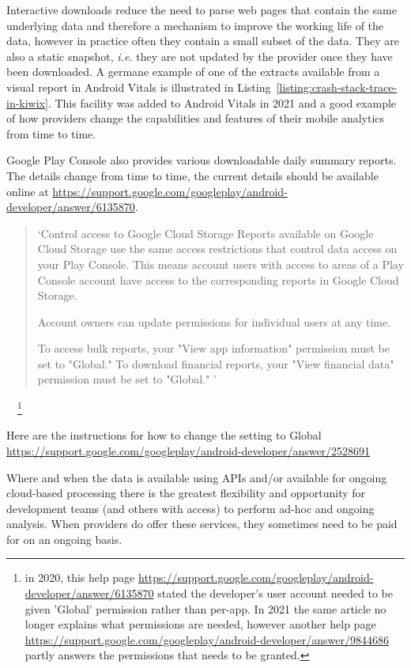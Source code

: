 Interactive downloads reduce the need to parse web pages that contain the same underlying data and therefore a mechanism to improve the working life of the data, however in practice often they contain a small subset of the data. They are also a static snapshot, \textit{i.e.} they are not updated by the provider once they have been downloaded. A germane example of one of the extracts available from a visual report in Android Vitals is illustrated in Listing~\ref{listing:crash-stack-trace-in-kiwix}. This facility was added to Android Vitals in 2021 and a good example of how providers change the capabilities and features of their mobile analytics from time to time.

Google Play Console also provides various downloadable daily summary reports. The details change from time to time, the current details should be available online at \url{https://support.google.com/googleplay/android-developer/answer/6135870}.

{\footnotesize
\begin{quote}
    `Control access to Google Cloud Storage
    Reports available on Google Cloud Storage use the same access restrictions that control data access on your Play Console. This means account users with access to areas of a Play Console account have access to the corresponding reports in Google Cloud Storage.
    
    Account owners can update permissions for individual users at any time.
    
        To access bulk reports, your "View app information" permission must be set to "Global."
        To download financial reports, your "View financial data" permission must be set to "Global." '
\end{quote}}~\citep{google_play_download_and_export_monthly_reports}~\footnote{in 2020, this help page  \url{https://support.google.com/googleplay/android-developer/answer/6135870} stated the developer's user account needed to be given 'Global' permission rather than per-app. In 2021 the same article no longer explains what permissions are needed, however another help page \url{https://support.google.com/googleplay/android-developer/answer/9844686} partly answers the permissions that needs to be granted.}

Here are the instructions for how to change the setting to Global \url{https://support.google.com/googleplay/android-developer/answer/2528691}

Where and when the data is available using APIs and/or available for ongoing cloud-based processing there is the greatest flexibility and opportunity for development teams (and others with access) to perform ad-hoc and ongoing analysis. When providers do offer these services, they sometimes need to be paid for on an ongoing basis. 

